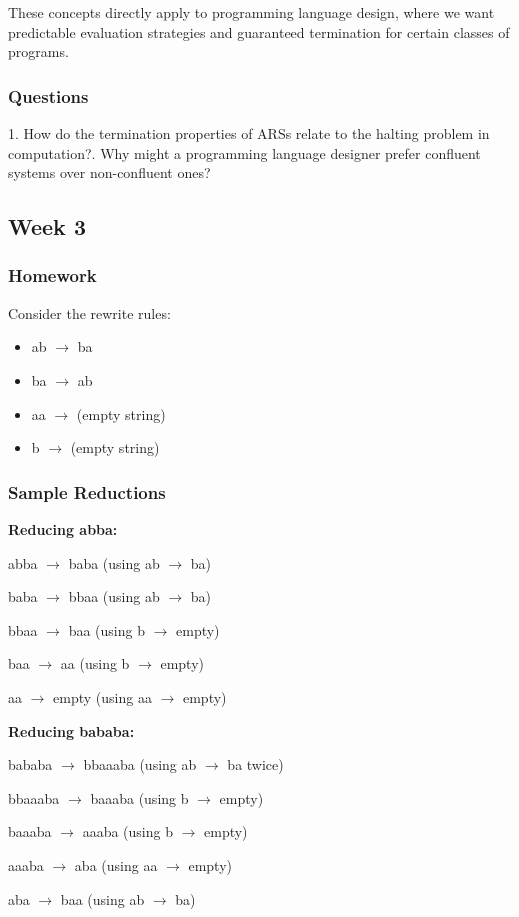 \documentclass{article}
\theoremstyle{theorem}
\theoremstyle{definition}
\theoremstyle{remark}
\begin{document}
    These concepts directly apply to programming language design, where we want predictable evaluation strategies and guaranteed termination for certain classes of programs.
    
    \subsubsection{Questions}
    1. How do the termination properties of ARSs relate to the halting problem in computation?. Why might a programming language designer prefer confluent systems over non-confluent ones?\newline

\subsection{Week 3}
\subsubsection{Homework}
Consider the rewrite rules:
\begin{itemize}
\item ab $\to$ ba
\item ba $\to$ ab  
\item aa $\to$ (empty string)
\item b $\to$ (empty string)
\end{itemize}

\subsubsection{Sample Reductions}
\textbf{Reducing abba:}

abba $\to$ baba (using ab $\to$ ba)

baba $\to$ bbaa (using ab $\to$ ba)

bbaa $\to$ baa (using b $\to$ empty)

baa $\to$ aa (using b $\to$ empty)

aa $\to$ empty (using aa $\to$ empty)

\textbf{Reducing bababa:}

bababa $\to$ bbaaaba (using ab $\to$ ba twice)

bbaaaba $\to$ baaaba (using b $\to$ empty)

baaaba $\to$ aaaba (using b $\to$ empty)

aaaba $\to$ aba (using aa $\to$ empty)

aba $\to$ baa (using ab $\to$ ba)
\end{document}
